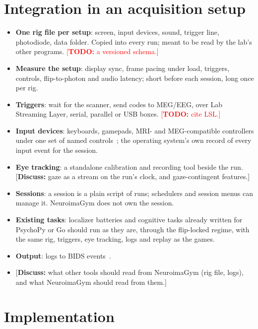 \documentclass{article}
\newcommand{\TODO}[1]{\textcolor{red}{[\textbf{TODO:} #1]}}
\newcommand{\question}[1]{\textcolor{blue!70!black}{[\textbf{Discuss:} #1]}}
\begin{document}
\section{Integration in an acquisition setup}
\label{sec:integration}

\begin{itemize}
  \item \textbf{One rig file per setup}: screen, input devices, sound, trigger line, photodiode, data folder. Copied into every run; meant to be read by the lab's other programs. \TODO{a versioned schema.}
  \item \textbf{Measure the setup}: display sync, frame pacing under load, triggers, controls, flip-to-photon and audio latency; short before each session, long once per rig.
  \item \textbf{Triggers}: wait for the scanner, send codes to MEG/EEG, over Lab Streaming Layer, serial, parallel or USB boxes. \TODO{cite LSL.}
  \item \textbf{Input devices}: keyboards, gamepads, MRI- and MEG-compatible controllers under one set of named controls~\citep{harel2023controller}; the operating system's own record of every input event for the session.
  \item \textbf{Eye tracking}: a standalone calibration and recording tool beside the run. \question{gaze as a stream on the run's clock, and gaze-contingent features.}
  \item \textbf{Sessions}: a session is a plain script of runs; schedulers and session menus can manage it. NeuroimaGym does not own the session.
  \item \textbf{Existing tasks}: localizer batteries and cognitive tasks already written for PsychoPy or Go should run as they are, through the flip-locked regime, with the same rig, triggers, eye tracking, logs and replay as the games.
  \item \textbf{Output}: logs to BIDS events~\citep{gorgolewski2016bids}.
  \item \question{what other tools should read from NeuroimaGym (rig file, logs), and what NeuroimaGym should read from them.}
\end{itemize}

\section{Implementation}
\label{sec:implementation}
\end{document}
